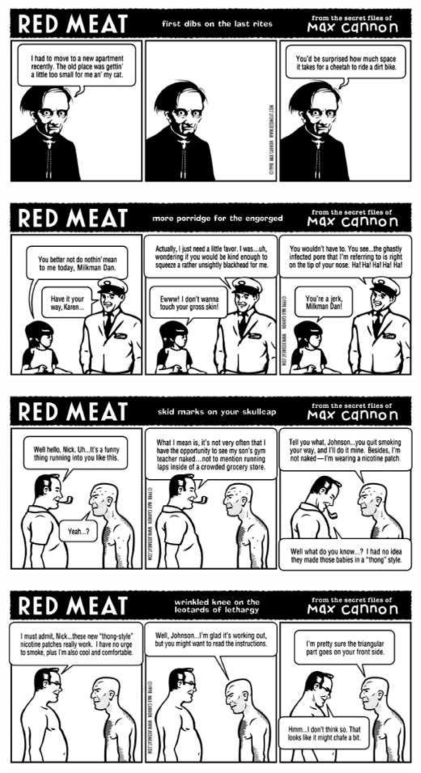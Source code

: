 \documentclass[a4paper,twoside,11pt]{article}
\begin{document}
\includegraphics[width=\textwidth]{redmeat_1998-09-28.png}



\includegraphics[width=\textwidth]{redmeat_1998-10-05.png}



\includegraphics[width=\textwidth]{redmeat_1998-10-12.png}



\includegraphics[width=\textwidth]{redmeat_1998-10-19.png}
\end{document}

